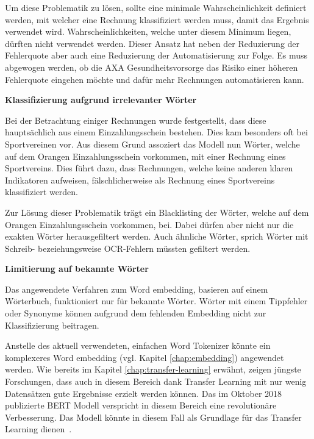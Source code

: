 Um diese Problematik zu lösen, sollte eine minimale Wahrscheinlichkeit definiert werden, mit welcher eine Rechnung klassifiziert werden muss, damit das Ergebnis verwendet wird. Wahrscheinlichkeiten, welche unter diesem Minimum liegen, dürften nicht verwendet werden. Dieser Ansatz hat neben der Reduzierung der Fehlerquote aber auch eine Reduzierung der Automatisierung zur Folge. Es muss abgewogen werden, ob die AXA Gesundheitsvorsorge das Risiko einer höheren Fehlerquote eingehen möchte und dafür mehr Rechnungen automatisieren kann.

{\parindent=0pt
\textbf{Klassifizierung aufgrund irrelevanter Wörter}}

Bei der Betrachtung einiger Rechnungen wurde festgestellt, dass diese hauptsächlich aus einem Einzahlungsschein bestehen. Dies kam besonders oft bei Sportvereinen vor. Aus diesem Grund assoziert das Modell nun Wörter, welche auf dem Orangen Einzahlungsschein vorkommen, mit einer Rechnung eines Sportvereins. Dies führt dazu, dass Rechnungen, welche keine anderen klaren Indikatoren aufweisen, fälschlicherweise als Rechnung eines Sportvereins klassifiziert werden.

Zur Lösung dieser Problematik trägt ein Blacklisting der Wörter, welche auf dem Orangen Einzahlungsschein vorkommen, bei. Dabei dürfen aber nicht nur die exakten Wörter herausgefiltert werden. Auch ähnliche Wörter, sprich Wörter mit Schreib- bezeiehungsweise OCR-Fehlern müssten gefiltert werden.

{\parindent=0pt
\textbf{Limitierung auf bekannte Wörter}}

Das angewendete Verfahren zum Word embedding, basieren auf einem Wörterbuch, funktioniert nur für bekannte Wörter. Wörter mit einem Tippfehler oder Synonyme können aufgrund dem fehlenden Embedding nicht zur Klassifizierung beitragen.

Anstelle des aktuell verwendeten, einfachen Word Tokenizer könnte ein komplexeres Word embedding (vgl. Kapitel \ref{chap:embedding}) angewendet werden. Wie bereits im Kapitel \ref{chap:transfer-learning} erwähnt, zeigen jüngste Forschungen, dass auch in diesem Bereich dank Transfer Learning mit nur wenig Datensätzen gute Ergebnisse erzielt werden können. Das im Oktober 2018 publizierte BERT Modell verspricht in diesem Bereich eine revolutionäre Verbesserung. Das Modell könnte in diesem Fall als Grundlage für das Transfer Learning dienen~\autocite{Devlin2018}.
